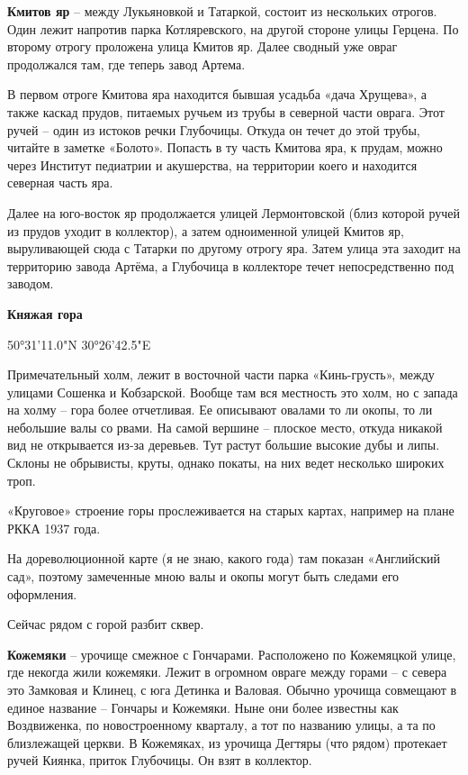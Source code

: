 \medskip


\textbf{Кмитов яр} – между Лукьяновкой и Татаркой, состоит из нескольких отрогов. Один 
лежит напротив парка Котляревского, на другой стороне улицы Герцена. По второму отрогу проложена улица Кмитов яр. Далее сводный уже овраг продолжался там, где теперь завод Артема.

В первом отроге Кмитова яра находится бывшая усадьба «дача Хрущева», а также каскад прудов, питаемых ручьем из трубы в северной части оврага. Этот ручей – один из истоков речки Глубочицы. Откуда он течет до этой трубы, читайте в заметке «Болото». Попасть в ту часть Кмитова яра, к прудам, можно через Институт педиатрии и акушерства, на территории коего и находится северная часть яра.

Далее на юго-восток яр продолжается улицей Лермонтовской (близ которой ручей из прудов уходит в коллектор), а затем одноименной улицей Кмитов яр, выруливающей сюда с Татарки по другому отрогу яра. Затем улица эта заходит на территорию завода Артёма, а Глубочица в коллекторе течет непосредственно под заводом.\\

\medskip


\textbf{Княжая гора} 

50°31'11.0"N 30°26'42.5"E

Примечательный холм, лежит в восточной части парка «Кинь-грусть», между улицами Сошенка и Кобзарской. Вообще там вся местность это холм, но с запада на холму – гора более отчетливая. Ее описывают овалами то ли окопы, то ли небольшие валы со рвами. На самой вершине – плоское место, откуда никакой вид не открывается из-за деревьев. Тут растут большие высокие дубы и липы. Склоны не обрывисты, круты, однако покаты, на них ведет несколько широких троп. 

«Круговое» строение горы прослеживается на старых картах, например на плане РККА 1937 года.

На дореволюционной карте (я не знаю, какого года) там показан «Английский сад», поэтому замеченные мною валы и окопы могут быть следами его оформления.

Сейчас рядом с горой разбит сквер.\\

\medskip


\textbf{Кожемяки} – урочище смежное с Гончарами. Расположено по Кожемяцкой улице, где некогда жили кожемяки. Лежит в огромном овраге между горами – с севера это Замковая и Клинец, с юга Детинка и Валовая. Обычно урочища совмещают в единое название – Гончары и Кожемяки. Ныне они более известны как Воздвиженка, по новостроенному кварталу, а тот по названию улицы, а та по близлежащей церкви. В Кожемяках, из урочища Дегтяры (что рядом) протекает ручей Киянка, приток Глубочицы. Он взят в коллектор.\\


